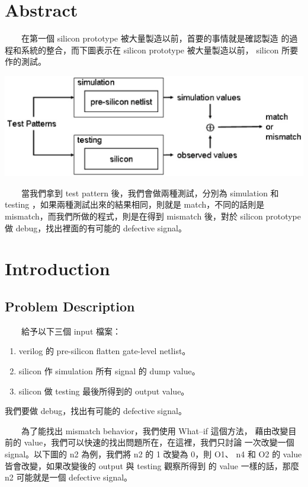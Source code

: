 \documentclass[12pt,a4paper]{article}
\begin{document}


\section{Abstract}

　　在第一個 silicon prototype 被大量製造以前，首要的事情就是確認製造%
的過程和系統的整合，而下圖表示在 silicon prototype 被大量製造以前，%
silicon 所要作的測試。

\begin{center}
\includegraphics[scale=0.6]{imgs/01.eps}
\end{center}

　　當我們拿到 test pattern 後，我們會做兩種測試，分別為 simulation %
和 testing ，如果兩種測試出來的結果相同，則就是 match，不同的話則是%
mismatch，而我們所做的程式，則是在得到 mismatch 後，對於 silicon %
prototype 做 debug，找出裡面的有可能的 defective signal。

\section{Introduction}

\subsection{Problem Description}

　　給予以下三個 input 檔案：

\begin{enumerate}
\item verilog 的 pre-silicon flatten gate-level netlist。
\item silicon 作 simulation 所有 signal 的 dump value。
\item silicon 做 testing 最後所得到的 output value。
\end{enumerate}

我們要做 debug，找出有可能的 defective signal。

　　為了能找出 mismatch behavior，我們使用 What–if 這個方法，%
藉由改變目前的 value，我們可以快速的找出問題所在，在這裡，我們只討論%
一次改變一個 signal。以下圖的 n2 為例，我們將 n2 的 1 改變為 0，則 O1、%
n4 和 O2 的 value 皆會改變，如果改變後的 output 與 testing 觀察所得到%
的 value 一樣的話，那麼 n2 可能就是一個 defective signal。
\end{document}
